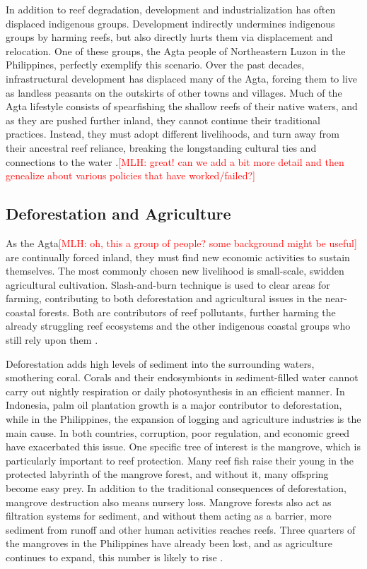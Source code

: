 \documentclass{book}\usepackage{knitr}
\newcommand{\red}[1]{\textcolor{red}{[MLH: #1]}}
\begin{document}
\begin{knitrout}
\begin{kframe}
{In addition to reef degradation, development and industrialization has often displaced indigenous groups. Development indirectly undermines indigenous groups by harming reefs, but also directly hurts them via displacement and relocation. One of these groups, the Agta people of Northeastern Luzon in the Philippines, perfectly exemplify this scenario. Over the past decades, infrastructural development has displaced many of the Agta, forcing them to live as landless peasants on the outskirts of other towns and villages. Much of the Agta lifestyle consists of spearfishing the shallow reefs of their native waters, and as they are pushed further inland, they cannot continue their traditional practices. Instead, they must adopt different livelihoods, and turn away from their ancestral reef reliance, breaking the longstanding cultural ties and connections to the water \citep{RePEc:gam:jsusta:v:12:y:2020:i:19:p:7983-:d:420111}.\red{great!  can we add a bit more detail and then genealize about various policies that have worked/failed?}

\subsection{Deforestation and Agriculture}

As the Agta\red{oh, this a group of people?  some background might be useful} are continually forced inland, they must find new economic activities to sustain themselves. The most commonly chosen new livelihood is small-scale, swidden agricultural cultivation. Slash-and-burn technique is used to clear areas for farming, contributing to both deforestation and agricultural issues in the near-coastal forests. Both are contributors of reef pollutants, further harming the already struggling reef ecosystems and the other indigenous coastal groups who still rely upon them \citep{RePEc:gam:jsusta:v:12:y:2020:i:19:p:7983-:d:420111}.

Deforestation adds high levels of sediment into the surrounding waters, smothering coral. Corals and their endosymbionts in sediment-filled water cannot carry out nightly respiration or daily photosynthesis in an efficient manner. In Indonesia, palm oil plantation growth is a major contributor to deforestation, while in the Philippines, the expansion of logging and agriculture industries is the main cause. In both countries, corruption, poor regulation, and economic greed have exacerbated this issue. One specific tree of interest is the mangrove, which is particularly important to reef protection. Many reef fish raise their young in the protected labyrinth of the mangrove forest, and without it, many offspring become easy prey. In addition to the traditional consequences of deforestation, mangrove destruction also means nursery loss. Mangrove forests also act as filtration systems for sediment, and without them acting as a barrier, more sediment from runoff and other human activities reaches reefs. Three quarters of the mangroves in the Philippines have already been lost, and as agriculture continues to expand, this number is likely to rise \citep{coralreefalliance_2021}.

}
\end{kframe}
\end{knitrout}
\end{document}
